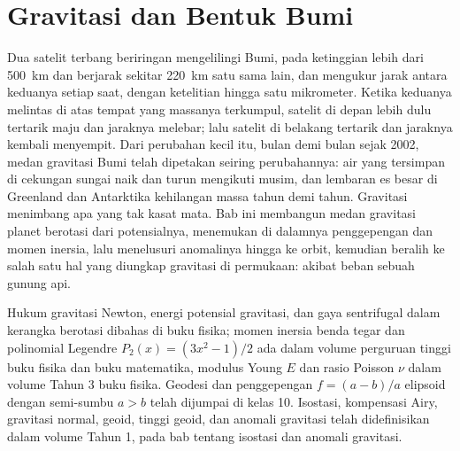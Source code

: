 \chapter{Gravitasi dan Bentuk Bumi}\label{ch:b3:gravity-geodesy}

Dua satelit terbang beriringan mengelilingi Bumi, pada ketinggian lebih dari
\qty{500}{km} dan berjarak sekitar \qty{220}{km} satu sama lain, dan mengukur jarak
antara keduanya setiap saat, dengan ketelitian hingga satu mikrometer.
Ketika keduanya melintas di atas tempat yang massanya terkumpul, satelit di depan
lebih dulu tertarik maju dan jaraknya melebar; lalu satelit di belakang
tertarik dan jaraknya kembali menyempit. Dari perubahan kecil itu, bulan demi bulan sejak 2002,
medan gravitasi Bumi telah dipetakan seiring perubahannya: air yang tersimpan di
cekungan sungai naik dan turun mengikuti musim, dan lembaran es besar di
Greenland dan Antarktika kehilangan massa tahun demi tahun. Gravitasi menimbang
apa yang tak kasat mata. Bab ini membangun medan gravitasi planet berotasi dari
potensialnya, menemukan di dalamnya penggepengan dan momen inersia, lalu menelusuri
anomalinya hingga ke orbit, kemudian beralih ke salah satu hal yang diungkap gravitasi
di permukaan:  akibat beban sebuah gunung api.

\begin{recall}
Hukum gravitasi Newton, energi potensial gravitasi, dan
gaya sentrifugal dalam kerangka berotasi dibahas di buku fisika; momen inersia
benda tegar dan polinomial Legendre $P_2(x) = (3x^2 - 1)/2$ ada dalam
volume perguruan tinggi buku fisika dan buku matematika, modulus Young $E$ dan
rasio Poisson $\nu$ dalam volume Tahun 3 buku fisika. Geodesi dan
penggepengan $f = (a - b)/a$ elipsoid dengan semi-sumbu $a > b$ telah dijumpai di
kelas 10. Isostasi, kompensasi Airy, gravitasi normal, geoid, tinggi geoid,
dan anomali gravitasi telah didefinisikan dalam volume Tahun 1, pada bab
tentang isostasi dan anomali gravitasi.
\end{recall}

